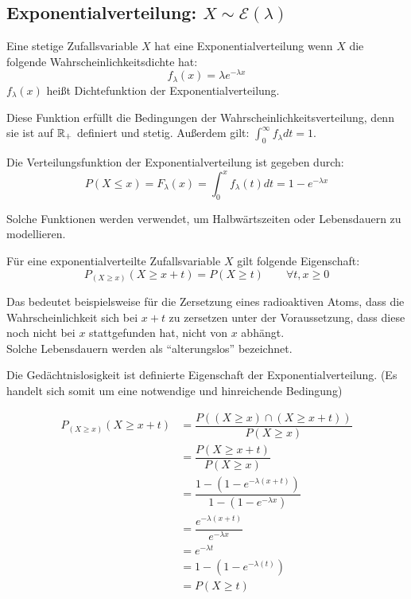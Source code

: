 \documentclass[../MAIN/main.tex]{subfiles}
\begin{document}
\subsection{Exponentialverteilung: $X \sim \mathcal{E}(\lambda)$}
\begin{Definition}
  Eine stetige Zufallsvariable $X$ hat eine Exponentialverteilung wenn $X$ die folgende Wahrscheinlichkeitsdichte hat:
  $$f_\lambda (x) = \lambda e^{-\lambda x}$$
  $f_\lambda(x)$ heißt Dichtefunktion der Exponentialverteilung.
\end{Definition}
\begin{Bemerkung}
  Diese Funktion erfüllt die Bedingungen der Wahrscheinlichkeitsverteilung, denn sie ist auf $\mathbb{R}_{+}$ definiert und stetig. Außerdem gilt: $\displaystyle \int_0^\infty f_\lambda dt = 1$.
\end{Bemerkung}
\begin{Definition}
  Die Verteilungsfunktion der Exponentialverteilung ist gegeben durch:
  $$P(X \leq x) = F_\lambda(x) = \int_{0}^{x} f_\lambda(t) dt = 1 - e^{-\lambda x}$$
\end{Definition}
\begin{Bemerkung}
  Solche Funktionen werden verwendet, um Halbwärtszeiten oder Lebensdauern zu modellieren.
\end{Bemerkung}
\begin{Theorem}[- Gedächtnislosigkeit]
  Für eine exponentialverteilte Zufallsvariable $X$ gilt folgende Eigenschaft:
  $$P_{(X \geq x)}(X \geq x+t) = P(X \geq t)\qquad \forall t,x \geq 0$$
\end{Theorem}
\begin{Bemerkung}
  Das bedeutet beispielsweise für die Zersetzung eines radioaktiven Atoms, dass die Wahrscheinlichkeit sich bei $x+t$ zu zersetzen unter der Voraussetzung, dass diese noch nicht bei $x$ stattgefunden hat, nicht von $x$ abhängt.\\
  Solche Lebensdauern werden als ``alterungslos'' bezeichnet.
\end{Bemerkung}
\begin{Bemerkung}
  Die Gedächtnislosigkeit ist definierte Eigenschaft der Exponentialverteilung. (Es handelt sich somit um eine notwendige und hinreichende Bedingung)
\end{Bemerkung}
\begin{Beweis}
  \begin{align*}
    P_{(X \geq x)}(X \geq x+t) &= \dfrac{P((X \geq x)\cap(X \geq x+t))}{P(X \geq x)}\\
    &= \dfrac{P(X \geq x+t)}{P(X \geq x)}\\
    &= \dfrac{1-(1-e^{-\lambda(x+t)})}{1-(1-e^{-\lambda x})}\\
    &= \dfrac{e^{-\lambda(x+t)}}{e^{-\lambda x}}\\
    &= e^{-\lambda t}\\
    &= 1-(1-e^{-\lambda(t)})\\
    &= P(X \geq t)
  \end{align*}
\end{Beweis}
\end{document}
